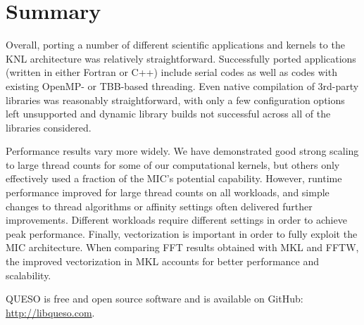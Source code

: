 \section{Summary}
\label{sec:summary}

%
%
Overall, porting a number of different scientific applications and
kernels to the KNL architecture was relatively
straightforward. Successfully ported applications (written in either
Fortran or C++) include serial codes as well as codes with existing
OpenMP- or TBB-based threading.  Even native compilation of 3rd-party
libraries was reasonably straightforward, with only a few
configuration options left unsupported and dynamic library builds not
successful across all of the libraries considered.

Performance results vary more widely.  We have demonstrated good
strong scaling to large thread counts for some of our computational
kernels, but others only effectively used a fraction of the MIC's
potential capability.  However, runtime performance improved
for large thread counts on all workloads, and simple changes to
thread algorithms or affinity settings often delivered further
improvements.  Different workloads require different settings in order
to achieve peak performance. Finally, vectorization is important in
order to fully exploit the MIC architecture. When comparing FFT
results obtained with MKL and FFTW, the improved vectorization in
MKL accounts for better performance and scalability.

QUESO is free and open source software and is available on GitHub: \url{http://libqueso.com}.
